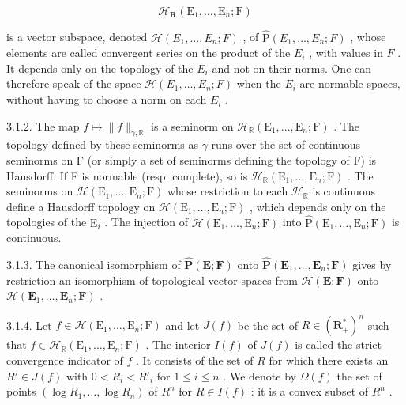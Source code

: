 \[
\mathcal {H} _ {\mathbf {R}} (\mathrm{E} _ {1}, \dots , \mathrm{E} _ {n}; \mathrm{F})
\]

is a vector subspace, denoted \(\mathcal{H}(E_{1},\ldots,E_{n};F)\) , of \(\hat{\mathrm{P}}(E_{1},\ldots,E_{n};F)\) , whose elements are called convergent series on the product of the \(E_{i}\) , with values in \(F\) . It depends only on the topology of the \(E_{i}\) and not on their norms. One can therefore speak of the space \(\mathcal{H}(E_{1},\ldots,E_{n};F)\) when the \(E_{i}\) are normable spaces, without having to choose a norm on each \(E_{i}\) .

3.1.2. The map \(f\mapsto\|f\|_{\gamma,\mathbb{R}}\) is a seminorm on \(\mathcal{H}_{\mathbb{R}}(\mathrm{E}_{1},\ldots,\mathrm{E}_{n};\mathrm{F})\) . The topology defined by these seminorms as \(\gamma\) runs over the set of continuous seminorms on F (or simply a set of seminorms defining the topology of F) is Hausdorff. If F is normable (resp. complete), so is \(\mathcal{H}_{\mathbb{R}}(\mathrm{E}_{1},\ldots,\mathrm{E}_{n};\mathrm{F})\) . The seminorms on \(\mathcal{H}(\mathrm{E}_{1},\ldots,\mathrm{E}_{n};\mathrm{F})\) whose restriction to each \(\mathcal{H}_{\mathbb{R}}\) is continuous define a Hausdorff topology on \(\mathcal{H}(\mathrm{E}_{1},\ldots,\mathrm{E}_{n};\mathrm{F})\) , which depends only on the topologies of the \(\mathrm{E}_{i}\) . The injection of \(\mathcal{H}(\mathrm{E}_{1},\ldots,\mathrm{E}_{n};\mathrm{F})\) into \(\hat{\mathrm{P}}(\mathrm{E}_{1},\ldots,\mathrm{E}_{n};\mathrm{F})\) is continuous.

3.1.3. The canonical isomorphism of \(\hat{\mathbf{P}}(\mathbf{E};\mathbf{F})\) onto \(\hat{\mathbf{P}}(\mathbf{E}_{1},\ldots,\mathbf{E}_{n};\mathbf{F})\) gives by restriction an isomorphism of topological vector spaces from \(\mathcal{H}(\mathbf{E};\mathbf{F})\) onto \(\mathcal{H}(\mathbf{E}_{1},\ldots,\mathbf{E}_{n};\mathbf{F})\) .

3.1.4. Let \(f \in \mathcal{H}(\mathrm{E}_1, \ldots, \mathrm{E}_n; \mathrm{F})\) and let \(J(f)\) be the set of \(R \in (\mathbf{R}_+^*)^n\) such that \(f \in \mathcal{H}_{\mathbb{R}}(\mathrm{E}_1, \ldots, \mathrm{E}_n; \mathrm{F})\) . The interior \(I(f)\) of \(J(f)\) is called the strict convergence indicator of \(f\) . It consists of the set of \(R\) for which there exists an \(R' \in J(f)\) with \(0 < R_i < R'_i\) for \(1 \leqslant i \leqslant n\) . We denote by \(\Omega(f)\) the set of points \((\log R_1, \ldots, \log R_n)\) of \(R^n\) for \(R \in I(f)\) : it is a convex subset of \(R^n\) .

